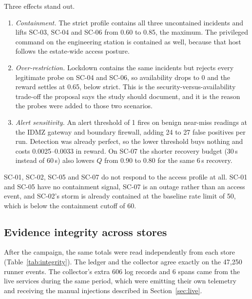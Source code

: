 \documentclass[11pt]{article}
\begin{document}
Three effects stand out.
\begin{enumerate}[leftmargin=1.6em,itemsep=2pt]
\item \emph{Containment.} The strict profile contains all three uncontained
incidents and lifts SC-03, SC-04 and SC-06 from 0.60 to 0.85, the maximum. The
privileged command on the engineering station is contained as well, because that
host follows the estate-wide access posture.
\item \emph{Over-restriction.} Lockdown contains the same incidents but rejects
every legitimate probe on SC-04 and SC-06, so availability drops to 0 and the
reward settles at 0.65, below strict. This is the security-versus-availability
trade-off the proposal says the study should document, and it is the reason the
probes were added to those two scenarios.
\item \emph{Alert sensitivity.} An alert threshold of 1 fires on benign near-miss
readings at the IDMZ gateway and boundary firewall, adding 24 to 27 false
positives per run. Detection was already perfect, so the lower threshold buys
nothing and costs 0.0025--0.0033 in reward. On SC-07 the shorter recovery budget
(30\,s instead of 60\,s) also lowers $Q$ from 0.90 to 0.80 for the same 6\,s
recovery.
\end{enumerate}
SC-01, SC-02, SC-05 and SC-07 do not respond to the access profile at all. SC-01
and SC-05 have no containment signal, SC-07 is an outage rather than an access
event, and SC-02's storm is already contained at the baseline rate limit of 50,
which is below the containment cutoff of 60.

\subsection{Evidence integrity across stores}
\label{sec:integrity}
After the campaign, the same totals were read independently from each store
(Table~\ref{tab:integrity}). The ledger and the collector agree exactly on the
47{,}250 runner events. The collector's extra 606 log records and 6 spans came
from the live services during the same period, which were emitting their own
telemetry and receiving the manual injections described in Section~\ref{sec:live}.
\end{document}
